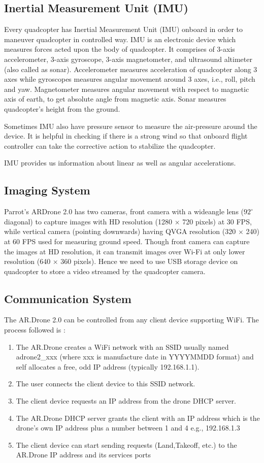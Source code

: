 \subsection{Inertial Measurement Unit (IMU)}
Every quadcopter has Inertial Measurement Unit (IMU) onboard in order to maneuver
quadcopter in controlled way. IMU is an electronic device which measures forces
acted upon the body of quadcopter. It comprises of 3-axis accelerometer, 3-axis
gyroscope, 3-axis magnetometer, and ultrasound altimeter (also called as sonar).
Accelerometer measures acceleration of quadcopter along 3 axes while gyroscopes
measures angular movement around 3 axes, i.e., roll, pitch and yaw. Magnetometer
measures angular movement with respect to magnetic axis of earth, to get
absolute angle from magnetic axis. Sonar measures quadcopter's
height from the ground.

Sometimes IMU also have pressure sensor to measure the air-pressure around the
device. It is helpful in checking if there is a strong wind so that
onboard flight controller can take the corrective action to stabilize the
quadcopter. 

IMU provides us information about linear as well as angular accelerations.
 
\subsection{Imaging System}
Parrot's ARDrone 2.0 has two cameras, front camera with a wideangle lens
($92^{\circ}$ diagonal) to capture images with HD resolution (1280 $\times$ 720
pixels) at 30 FPS, while vertical camera (pointing downwards) having QVGA
resolution (320 $\times$ 240) at 60 FPS used for measuring ground speed.
Though front camera can capture the images at HD resolution, it can transmit
images over Wi-Fi at only  lower resolution (640 $\times$ 360 pixels). Hence we
need to use USB storage device on quadcopter to store a video streamed by the
quadcopter camera. 

\subsection{Communication System}
The AR.Drone 2.0 can be controlled from any client device supporting WiFi. The 
process followed is :
\begin{enumerate}
  \item The AR.Drone creates a WiFi network with an SSID usually named
adrone2\_xxx (where xxx is manufacture date in YYYYMMDD format) and self
allocates a free, odd IP address (typically 192.168.1.1).

   \item The user connects the client device to this SSID network.
   \item The client device requests an IP address from the drone DHCP server.
   \item The AR.Drone DHCP server grants the client with an IP address which is
   the drone's own IP address plus a number between 1 and 4 e.g., 192.168.1.3
   \item The client device can start sending requests (Land,Takeoff, etc.) to
   the AR.Drone IP address and its services ports
\end{enumerate}

